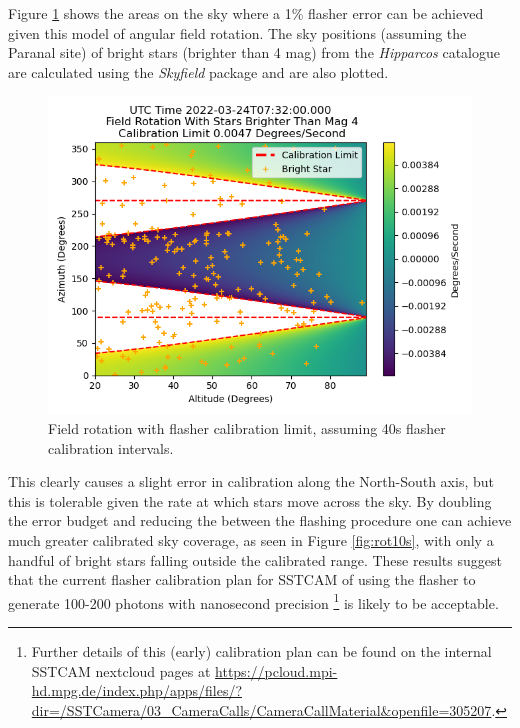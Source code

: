 Figure \ref{fig:rot40s} shows the areas on the sky where a 1\% flasher error can be achieved given this model of angular field rotation. The sky positions (assuming the Paranal site) of bright stars (brighter than 4 mag) from the \textit{Hipparcos} catalogue are calculated using the \textit{Skyfield} package and are also plotted.
\begin{figure}[t!]
\begin{centering}
\includegraphics[width=0.7\columnwidth]{./figures/rot40s.png}
\caption{Field rotation with flasher calibration limit, assuming 40s flasher calibration intervals.}
\label{fig:rot40s}
\end{centering}
\end{figure}

This clearly causes a slight error in calibration along the North-South axis, but this is tolerable given the rate at which stars move across the sky. By doubling the error budget and reducing the between the flashing procedure one can achieve much greater calibrated sky coverage, as seen in Figure \ref{fig:rot10s}, with only a handful of bright stars falling outside the calibrated range. These results suggest that the current flasher calibration plan for SSTCAM of using the flasher to generate 100-200 photons with nanosecond precision \footnote{Further details of this (early) calibration plan can be found on the internal SSTCAM nextcloud pages at \url{https://pcloud.mpi-hd.mpg.de/index.php/apps/files/?dir=/SSTCamera/03_CameraCalls/CameraCallMaterial&openfile=305207}.} is likely to be acceptable.

